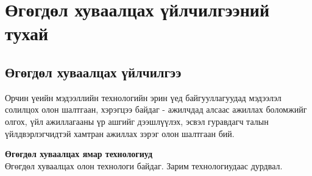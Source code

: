 
\chapter{Өгөгдөл хуваалцах үйлчилгээний тухай} %
\label{Chapter1} %
\pagecolor{white}

\newcommand{\keyword}[1]{\textbf{#1}}
\newcommand{\tabhead}[1]{\textbf{#1}}
\newcommand{\code}[1]{\texttt{#1}}
\newcommand{\file}[1]{\texttt{\bfseries#1}}
\newcommand{\option}[1]{\texttt{\itshape#1}}


\section{Өгөгдөл хуваалцах үйлчилгээ}
Орчин үеийн мэдээллийн технологийн эрин үед байгууллагуудад мэдээлэл солилцох олон шалтгаан, хэрэгцээ байдаг - ажилчдад алсаас ажиллах боломжийг олгох, үйл ажиллагааны үр ашгийг дээшлүүлэх, эсвэл гуравдагч талын үйлдвэрлэгчидтэй хамтран ажиллах зэрэг олон шалтгаан бий.

\textbf{Өгөгдөл хуваалцах ямар технологиуд}\\
Өгөгдөл хуваалцах олон технологи байдаг. Зарим технологиудаас дурдвал.

